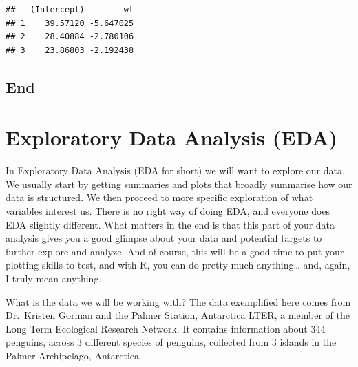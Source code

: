 \documentclass[
]{book}
\newenvironment{Shaded}{\begin{snugshade}}{\end{snugshade}}
\newcommand{\AttributeTok}[1]{\textcolor[rgb]{0.77,0.63,0.00}{#1}}
\newcommand{\CommentTok}[1]{\textcolor[rgb]{0.56,0.35,0.01}{\textit{#1}}}
\newcommand{\FunctionTok}[1]{\textcolor[rgb]{0.00,0.00,0.00}{#1}}
\newcommand{\NormalTok}[1]{#1}
\newcommand{\SpecialCharTok}[1]{\textcolor[rgb]{0.00,0.00,0.00}{#1}}
\begin{document}
\begin{Shaded}
\end{Shaded}

\begin{verbatim}
##   (Intercept)        wt
## 1    39.57120 -5.647025
## 2    28.40884 -2.780106
## 3    23.86803 -2.192438
\end{verbatim}

\hypertarget{end}{%
\section{End}\label{end}}

\hypertarget{exploratory-data-analysis-eda}{%
\chapter{Exploratory Data Analysis (EDA)}\label{exploratory-data-analysis-eda}}

In Exploratory Data Analysis (EDA for short) we will want to explore our data.
We usually start by getting summaries and plots that broadly summarise how our data is structured.
We then proceed to more specific exploration of what variables interest us.
There is no right way of doing EDA, and everyone does EDA slightly different.
What matters in the end is that this part of your data analysis gives you a good glimpse about your data and potential targets to further explore and analyze.
And of course, this will be a good time to put your plotting skills to test, and with R, you can do pretty much anything\ldots{} and, again, I truly mean anything.

What is the data we will be working with?
The data exemplified here comes from Dr.~Kristen Gorman and the Palmer Station, Antarctica LTER, a member of the Long Term Ecological Research Network.
It contains information about 344 penguins, across 3 different species of penguins, collected from 3 islands in the Palmer Archipelago, Antarctica.
\end{document}
